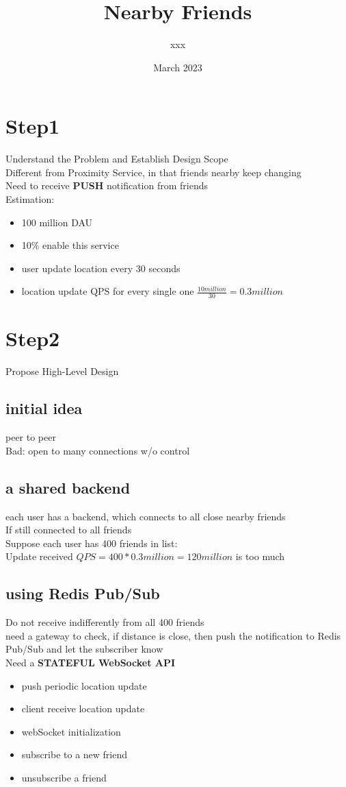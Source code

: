 \documentclass{article}
\title{Nearby Friends}
\author{xxx}
\date{March 2023}
\begin{document}
\maketitle

\section{Step1}
Understand the Problem and Establish Design Scope\\
Different from Proximity Service, in that friends nearby keep changing\\
Need to receive \textbf{PUSH} notification from friends\\
Estimation:\\
\begin{itemize}
    \item 100 million DAU
    \item 10\% enable this service
    \item user update location every 30 seconds\\
    \item location update QPS for every single one $\frac{10 million}{30} = 0.3million$
\end{itemize}
\section{Step2}
Propose High-Level Design\\
\subsection{initial idea}
peer to peer\\
Bad: open to many connections w/o control\\
\subsection{a shared backend}
each user has a backend, which connects to all close nearby friends\\
If still connected to all friends\\
Suppose each user has 400 friends in list:\\
Update received $QPS = 400 * 0.3 million = 120 million$ is too much
\subsection{using Redis Pub/Sub}
Do not receive indifferently from all 400 friends\\
need a gateway to check, if distance is close, then push the notification to Redis Pub/Sub and let the subscriber know\\
Need a \textbf{STATEFUL WebSocket API}
\begin{itemize}
    \item push periodic location update
    \item client receive location update
    \item webSocket initialization
    \item subscribe to a new friend
    \item unsubscribe a friend
\end{itemize}
\end{document}
